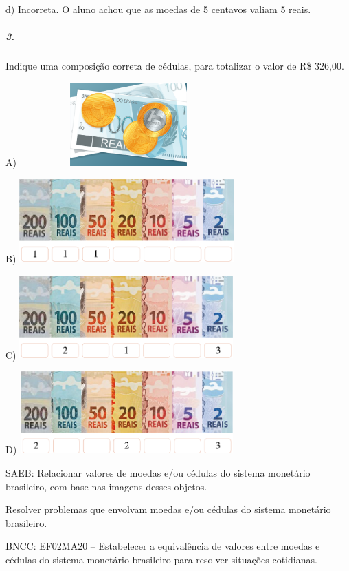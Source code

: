 d) Incorreta. O aluno achou que as moedas de 5 centavos valiam 5 reais.

\subparagraph{3.}\label{section-67}

Indique uma composição correta de cédulas, para totalizar o valor de R\$
326,00.

A) \includegraphics[width=3.30208in,height=1.25892in]{media/image79.png}

B) \includegraphics[width=3.24468in,height=1.27083in]{media/image80.png}

C) \includegraphics[width=3.23529in,height=1.26042in]{media/image81.png}

D) \includegraphics[width=3.23370in,height=1.23958in]{media/image82.png}

SAEB: Relacionar valores de moedas e/ou cédulas do sistema
monetário brasileiro, com base nas imagens desses objetos.

Resolver problemas que envolvam moedas e/ou cédulas do sistema
monetário brasileiro.

BNCC: EF02MA20 -- Estabelecer a equivalência de valores entre moedas e cédulas do sistema monetário brasileiro para resolver situações cotidianas.

